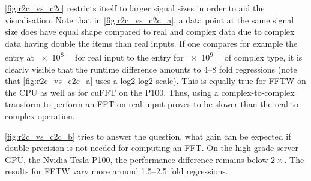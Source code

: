 \cref{fig:r2c_vs_c2c} restricts itself to larger signal sizes in order to aid the visualisation. Note that in \cref{fig:r2c_vs_c2c_a}, a data point at the same signal size does have equal shape compared to real and complex data due to complex data having double the items than real inputs. If one compares for example the entry at \SI[exponent-base=2]{e8}{\mebi\byte} for real input to the entry for \SI[exponent-base=2]{e9}{\mebi\byte} of complex type, it is clearly visible that the runtime difference amounts to \numrange{4}{8} fold regressions (note that \cref{fig:r2c_vs_c2c_a} uses a log2-log2 scale). This is equally true for FFTW on the CPU as well as for cuFFT on the P100. Thus, using a complex-to-complex transform to perform an FFT on real input proves to be slower than the real-to-complex operation.

\cref{fig:r2c_vs_c2c_b} tries to answer the question, what gain can be expected if double precision is not needed for computing an FFT. On the high grade server GPU, the Nvidia Tesla P100, the performance difference remains below $2{\times}$. The results for FFTW vary more around \numrange{1.5}{2.5} fold regressions. 




